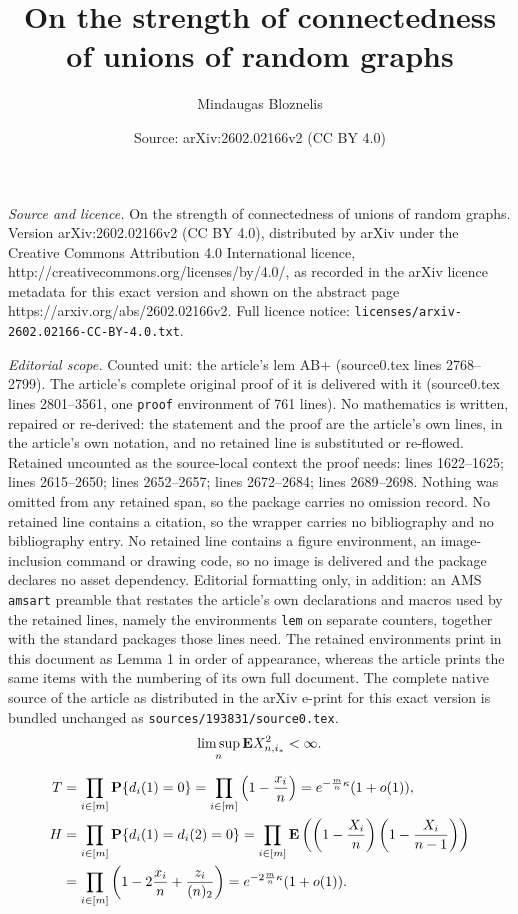 \documentclass[10pt,a4paper]{amsart}
\title{On the strength of connectedness of unions of random graphs}
\author{Mindaugas Bloznelis}
\date{Source: arXiv:2602.02166v2 (CC BY 4.0)}
\newcommand{\E}{{\bf{E}}}
\newcommand{\PP}{{\bf{P}}}
\begin{document}
\maketitle

\noindent\emph{Source and licence.} On the strength of connectedness of unions of random graphs. Version arXiv:2602.02166v2 (CC BY 4.0), distributed by arXiv under the Creative Commons Attribution 4.0 International licence, http://creativecommons.org/licenses/by/4.0/, as recorded in the arXiv licence metadata for this exact version and shown on the abstract page https://arxiv.org/abs/2602.02166v2. Full licence notice: \texttt{licenses/arxiv-2602.02166-CC-BY-4.0.txt}.\par\smallskip

\noindent\textit{Editorial scope.} Counted unit: the article's lem AB+ (source0.tex lines 2768--2799). The article's complete original proof of it is delivered with it (source0.tex lines 2801--3561, one \texttt{proof} environment of 761 lines). No mathematics is written, repaired or re-derived: the statement and the proof are the article's own lines, in the article's own notation, and no retained line is substituted or re-flowed.  Retained uncounted as the source-local context the proof needs: lines 1622--1625; lines 2615--2650; lines 2652--2657; lines 2672--2684; lines 2689--2698.  Nothing was omitted from any retained span, so the package carries no omission record.  No retained line contains a citation, so the wrapper carries no bibliography and no bibliography entry.  No retained line contains a figure environment, an image-inclusion command or drawing code, so no image is delivered and the package declares no asset dependency.  Editorial formatting only, in addition: an AMS \texttt{amsart} preamble that restates the article's own declarations and macros used by the retained lines, namely the environments \texttt{lem} on separate counters, together with the standard packages those lines need.  The retained environments print in this document as Lemma 1 in order of appearance, whereas the article prints the same items with the numbering of its own full document.  The complete native source of the article as distributed in the arXiv e-print for this exact version is bundled unchanged as \texttt{sources/193831/source0.tex}.
\begin{align}
\label{condition_X^2}
\limsup_n\E X_{n,i_*}^2<\infty.
\end{align}

\begin{align}
\label{T}
T
&
=
\prod_{i\in[m]}
\PP\{d_i(1)=0\}
=
\prod_{i\in[m]}
\left(1-\frac{x_i}{n}\right)
=
e^{-\frac{m}{n}\kappa}(1+o(1)),
\\
\nonumber
H
&
=
\prod_{i\in[m]}
\PP\{d_i(1)=d_i(2)=0\}
=
\prod_{i\in[m]}
\E
\left(
\left(1-\frac{X_i}{n}\right)
\left(1-\frac{X_i}{n-1}\right)
\right)
\\
\label{H}
&
=
\prod_{i\in[m]}
\left(
1-2\frac{x_i}{n}+\frac{z_i}{(n)_2}\right)
=
e^{-2\frac{m}{n}\kappa}(1+o(1)).
\end{align}
\end{document}
